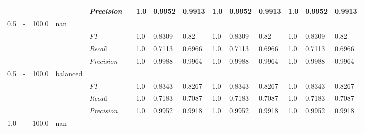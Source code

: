 \begin{table}[]
\begin{tabularx}{\textwidth}{XXlllllllllllll@{}}
& & & & \textit{Precision} && 1.0 & 0.9952 & 0.9913 & 1.0 & 0.9952 & 0.9913 & 1.0 & 0.9952 & 0.9913 \\ \midrule
0.5 & - & 100.0 & nan &                                                              &                                                                   &                                                             &                                                               &                                                                    &                                                              &                                                               &                                                                    &                                                              \\
& & & & \textit{F1} && 1.0        & 0.8309        & 0.82        & 1.0        & 0.8309        & 0.82        & 1.0        & 0.8309        & 0.82        \\
& & & & \textit{Recal}l && 1.0    & 0.7113    & 0.6966    & 1.0    & 0.7113    & 0.6966    & 1.0    & 0.7113    & 0.6966    \\
& & & & \textit{Precision} && 1.0 & 0.9988 & 0.9964 & 1.0 & 0.9988 & 0.9964 & 1.0 & 0.9988 & 0.9964 \\ \midrule
0.5 & - & 100.0 & balanced &                                                              &                                                                   &                                                             &                                                               &                                                                    &                                                              &                                                               &                                                                    &                                                              \\
& & & & \textit{F1} && 1.0        & 0.8343        & 0.8267        & 1.0        & 0.8343        & 0.8267        & 1.0        & 0.8343        & 0.8267        \\
& & & & \textit{Recal}l && 1.0    & 0.7183    & 0.7087    & 1.0    & 0.7183    & 0.7087    & 1.0    & 0.7183    & 0.7087    \\
& & & & \textit{Precision} && 1.0 & 0.9952 & 0.9918 & 1.0 & 0.9952 & 0.9918 & 1.0 & 0.9952 & 0.9918 \\ \midrule
1.0 & - & 100.0 & nan &                                                              &                                                                   &                                                             &                                                               &                                                                    &                                                              &                                                               &                                                                    &                                                              \\

\end{tabularx}
\end{table}

